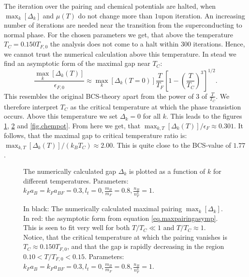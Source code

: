 The iteration over the pairing and chemical potentials are halted, when $\max_k[\Delta_k]$ and $\mu(T)$ do not change more than $1$\textperthousand  upon iteration. An increasing number of iterations are needed near the transition from the superconducting to normal phase. For the chosen parameters we get, that above the temperature $T_C = 0.150 T_{F,0}$ the analysis does not come to a halt within 300 iterations. Hence, we cannot trust the numerical calculation above this temperature. In stead we find an asymptotic form of the maximal gap near $T_C$:
\begin{equation}
\frac{\max_{k}[\Delta_k(T)]}{\epsilon_{F,0}} \approx \max_k[\Delta_{k}(T=0)]\frac{T}{T_F}\left[1 - \left(\frac{T}{T_C}\right)^3\right]^{1/2}. 
\label{eq.maxpairingasymp}
\end{equation}
This resembles the original BCS-theory apart from the power of 3 of $\frac{T}{T_C}$. We therefore interpret $T_C$ as the critical temperature at which the phase transistion occurs. Above this temperature we set $\Delta_k = 0$ for all $k$. This leads to the figures \ref{fig.Deltakkdepend}, \ref{fig.maxkDeltakTdepend} and \ref{fig.chempot}. From here we get, that $\max_{k,T}[\Delta_k(T)]/\epsilon_F \approx 0.301$. It follows, that the maximal gap to critical temperature ratio is: $\max_{k,T}[\Delta_k(T)]/(k_B T_C) \approx 2.00$. This is quite close to the BCS-value of $1.77$ \cite{BruusFlensberg}.  

\begin{figure} 
\begin{center}  
  
\caption{The numerically calculated gap $\Delta_k$ is plotted as a function of $k$ for different temperatures. Parameters: $k_F a_B = k_F a_{BF} = 0.3, l_t = 0, \frac{m_B}{m_F} = 0.8, \frac{n_B}{n_F^3} = 1$. }  
\label{fig.Deltakkdepend}  
\end{center}    
\end{figure}

\begin{figure} 
\begin{center}  
  
\caption{In black: The numerically calculated maximal pairing $\max_k[\Delta_k]$. In red: the asymptotic form from equation \eqref{eq.maxpairingasymp}. This is seen to fit very well for both $T/T_C \ll 1$ and $T/T_C \approx 1$. Notice, that the critical temperature at which the pairing vanishes is $T_C \approx 0.150 T_{F,0}$, and that the gap is rapidly decreasing in the region $0.10< T/T_{F,0} < 0.15$. Parameters: $k_F a_B = k_F a_{BF} = 0.3, l_t = 0, \frac{m_B}{m_F} = 0.8, \frac{n_B}{n_F^3} = 1$. }  
\label{fig.maxkDeltakTdepend}  
\end{center}    
\end{figure}

